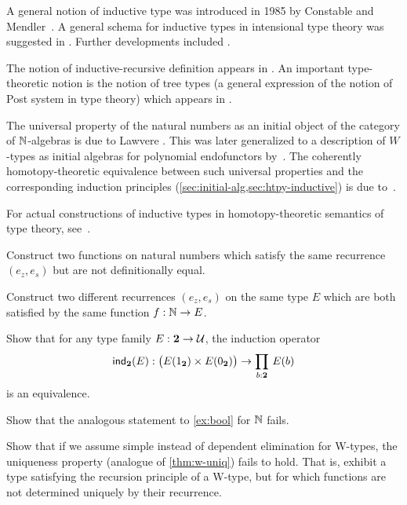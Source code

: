A general notion of inductive type was introduced in 1985 by Constable and Mendler~\cite{DBLP:conf/lop/ConstableM85}.  A general schema for inductive types in intensional type theory was suggested in
\cite{PfenningPaulinMohring}.  Further developments included \cite{CoquandPaulin, Dybjer:1991}.

The notion of inductive-recursive definition appears in \cite{Dybjer:2000}. An important  type-theoretic notion is the notion of tree types (a general expression of the notion of Post system in type theory) which appears in \cite{PeterssonSynek}.

The universal property of the natural numbers as an initial object of the category of $\mathbb{N}$-algebras is due to Lawvere \cite{lawvere:adjinfound}.
This was later generalized to a description of $W$-types as initial algebras for polynomial endofunctors by~\cite{mp:wftrees}.
The coherently homotopy-theoretic equivalence between such universal properties and the corresponding induction principles (\autoref{sec:initial-alg,sec:htpy-inductive}) is due to~\cite{ags:it-hott}.

For actual constructions of inductive types in homotopy-theoretic semantics of type theory, see~\cite{klv:ssetmodel,mvdb:wtypes,ls:hits}.

\sectionExercises

\begin{ex}\label{ex:same-recurrence-not-defeq}
  Construct two functions on natural numbers which satisfy the same recurrence $(e_z, e_s)$ but are not definitionally equal.
\end{ex}

\begin{ex}\label{ex:one-function-two-recurrences}
  Construct two different recurrences $(e_z,e_s)$ on the same type $E$ which are both satisfied by the same function $f:\mathbb{N}\to E$.
\end{ex}

\begin{ex}\label{ex:bool}
  Show that for any type family $E : \mathbf{2} \to \mathcal{U}$, the induction operator
  \[ \ind{\bool}(E) : \big(E(\btrue) \times E(\bfalse)\big) \to \prd{b : \bool} E(b) \]
  is an equivalence.
\end{ex}

\begin{ex}
  Show that the analogous statement to \autoref{ex:bool} for $\mathbb{N}$ fails.
\end{ex}

\begin{ex}
  Show that if we assume simple instead of dependent elimination for W-types, the uniqueness property (analogue of \autoref{thm:w-uniq}) fails to hold.
  That is, exhibit a type satisfying the recursion principle of a W-type, but for which functions are not determined uniquely by their recurrence.
\end{ex}

